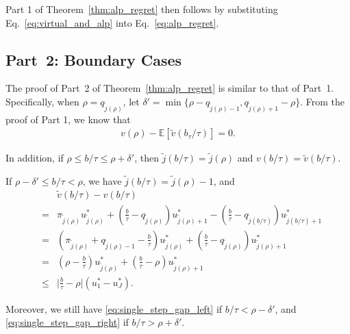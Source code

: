 Part 1 of Theorem~\ref{thm:alp_regret} then follows by substituting Eq.~\eqref{eq:virtual_and_alp} into Eq.~\eqref{eq:alp_regret}.


\subsection{Part~2: Boundary Cases}\label{app:proof_alp_regret_all}
The proof of Part~2 of Theorem~\ref{thm:alp_regret} is similar to that of Part~1. Specifically, when  $\rho = q_{\tilde{j}(\rho)}$, let $\delta' = \min\{\rho - q_{\tilde{j}(\rho)-1}, q_{\tilde{j}(\rho)+1} - \rho\}$.   From the proof of Part 1,
we know that
 \begin{eqnarray}
v(\rho)- \mathbb{E}[\tilde{v}(b_\tau/\tau)] = 0.
\end{eqnarray}

In addition, if $\rho \leq b/\tau \leq \rho + \delta'$, then $\tilde{j}(b/\tau) =  \tilde{j}(\rho)$ and $v(b/\tau) = \tilde{v}(b/\tau)$.

If $\rho - \delta' \leq b/\tau <\rho$, we have $\tilde{j}(b/\tau) = \tilde{j}(\rho) - 1$, and
\begin{eqnarray}
&&\tilde{v}(b/\tau) - v(b/\tau) \nonumber \\
& = & \pi_{\tilde{j}(\rho)} u^*_{\tilde{j}(\rho)} + (\frac{b}{\tau} - q_{\tilde{j}(\rho)})u^*_{\tilde{j}(\rho)+ 1}  - (\frac{b}{\tau} - q_{\tilde{j}(b/\tau)})u^*_{\tilde{j}(b/\tau) + 1} \nonumber \\
& = & (\pi_{\tilde{j}(\rho)} + q_{\tilde{j}(\rho) - 1} - \frac{b}{\tau})u^*_{\tilde{j}(\rho)} + (\frac{b}{\tau} - q_{\tilde{j}(\rho)})u^*_{\tilde{j}(\rho)+ 1} \nonumber \\
& = & (\rho - \frac{b}{\tau})u^*_{\tilde{j}(\rho)} + (\frac{b}{\tau} - \rho)u^*_{\tilde{j}(\rho)+ 1} \nonumber \\
&\leq & \big|\frac{b}{\tau} - \rho\big|(u_1^* - u^*_J).
\end{eqnarray}

Moreover, we still have \eqref{eq:single_step_gap_left} if  $b/\tau < \rho - \delta'$, and \eqref{eq:single_step_gap_right} if $b/\tau > \rho + \delta'$.

